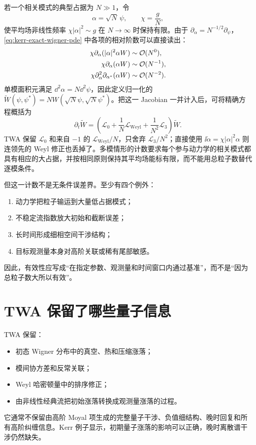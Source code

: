 若一个相关模式的典型占据为 $N\gg1$，令
\begin{equation}
  \alpha=\sqrt N\,\psi,
  \qquad \chi=\frac{g}{N},
  \label{eq:kerr-large-n-scaling}
\end{equation}
使平均场非线性频率 $\chi|\alpha|^2\sim g$ 在 $N\to\infty$ 时保持有限。由于 $\partial_\alpha=N^{-1/2}\partial_\psi$，\cref{eq:kerr-exact-wigner-pde} 中各项的相对阶数可以直接读出：
\begin{align}
  \chi\partial_\alpha(|\alpha|^2\alpha W)&\sim \mathcal{O}(N^0),\\
  \chi\partial_\alpha(\alpha W)&\sim \mathcal{O}(N^{-1}),\\
  \chi\partial_\alpha^2\partial_{\alpha^*}(\alpha W)&\sim \mathcal{O}(N^{-2}).
\end{align}
单模面积元满足 $\dd^2\alpha=N\dd^2\psi$，因此定义归一化的 $\widetilde W(\psi,\psi^*)=N W(\sqrt N\psi,\sqrt N\psi^*)$。把这一 Jacobian 一并计入后，可将精确方程概括为
\begin{equation}
  \partial_t\widetilde W=
  \left(\mathcal L_0+\frac1N\mathcal L_{\mathrm{Weyl}}
  +\frac1{N^2}\mathcal L_3\right)\widetilde W.
  \label{eq:twa-large-n-hierarchy}
\end{equation}
TWA 保留 $\mathcal L_0$ 和来自 $-1$ 的 $\mathcal L_{\mathrm{Weyl}}/N$，只舍弃 $\mathcal L_3/N^2$；直接使用 $\ii\dot\alpha=\chi|\alpha|^2\alpha$ 则连领先的 Weyl 修正也丢掉了。多模情形的计数要求每个参与动力学的相关模式都具有相应的大占据，并按相同原则保持其平均场能标有限，而不能用总粒子数替代逐模条件\cite{Polkovnikov2010}。

但这一计数不是无条件误差界。至少有四个例外：
\begin{enumerate}
  \item 动力学把粒子输运到大量低占据模式；
  \item 不稳定流指数放大初始和截断误差；
  \item 长时间形成细相空间干涉结构；
  \item 目标观测量本身对高阶关联或稀有尾部敏感。
\end{enumerate}
因此，有效性应写成“在指定参数、观测量和时间窗口内通过基准”，而不是“因为总粒子数大所以有效”。

\section{TWA 保留了哪些量子信息}

TWA 保留：
\begin{itemize}
  \item 初态 Wigner 分布中的真空、热和压缩涨落；
  \item 模间协方差和反常关联；
  \item Weyl 哈密顿量中的排序修正；
  \item 由非线性经典流把初始涨落转换成观测量涨落的过程。
\end{itemize}
它通常不保留由高阶 Moyal 项生成的完整量子干涉、负值细结构、晚时回复和所有高阶纠缠信息。Kerr 例子显示，初期量子涨落的影响可以正确，晚时离散谱干涉仍然缺失。

